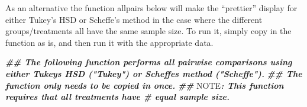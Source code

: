 \documentclass[
]{book}
\newenvironment{Shaded}{\begin{snugshade}}{\end{snugshade}}
\newcommand{\AlertTok}[1]{\textcolor[rgb]{0.94,0.16,0.16}{#1}}
\newcommand{\DocumentationTok}[1]{\textcolor[rgb]{0.56,0.35,0.01}{\textbf{\textit{#1}}}}
\begin{document}
As an alternative the function allpairs below will make the ``prettier'' display for either Tukey's HSD or Scheffe's method in the case where the different groups/treatments all have the same sample size. To run it, simply copy in the function as is, and then run it with the appropriate data.

\begin{Shaded}
\begin{Highlighting}[]
\DocumentationTok{\#\# The following function performs all pairwise comparisons using either Tukey\textquotesingle{}s HSD ("Tukey") or Scheffe\textquotesingle{}s method ("Scheffe").}
\DocumentationTok{\#\# The function only needs to be copied in once.}
\DocumentationTok{\#\# }\AlertTok{NOTE}\DocumentationTok{:  This function requires that all treatments have \#  equal sample size.}


\end{Highlighting}
\end{Shaded}
\end{document}

